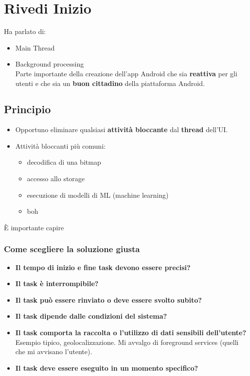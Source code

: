 
\chapter{Rivedi Inizio}
\par Ha parlato di:
\begin{itemize}
    \item Main Thread
    \item Background processing\\
    Parte importante della creazione dell'app Android che sia \textbf{reattiva} per gli utenti e che sia un \textbf{buon cittadino} della piattaforma Android.
\end{itemize}

\section{Principio}
\begin{itemize}
    \item Opportuno eliminare qualsiasi \textbf{attività bloccante} dal \textbf{thread} dell'UI.
    \item Attività bloccanti più comuni:
    \begin{itemize}
        \item decodifica di una bitmap
        \item accesso allo storage
        \item esecuzione di modelli di ML (machine learning)
        \item boh
    \end{itemize}
\end{itemize}
\par \`E importante capire 

\subsection{Come scegliere la soluzione giusta}
\begin{itemize}
    \item \textbf{Il tempo di inizio e fine task devono essere precisi?}
    \item \textbf{Il task è interrompibile?}
    \item \textbf{Il task può essere rinviato o deve essere svolto subito?}
    \item \textbf{Il task dipende dalle condizioni del sistema?}
    \item \textbf{Il task comporta la raccolta o l'utilizzo di dati sensibili dell'utente?}\\
    Esempio tipico, geolocalizzazione. Mi avvalgo di foreground services (quelli che mi avvisano l'utente).
    \item \textbf{Il task deve essere eseguito in un momento specifico?}
\end{itemize}

